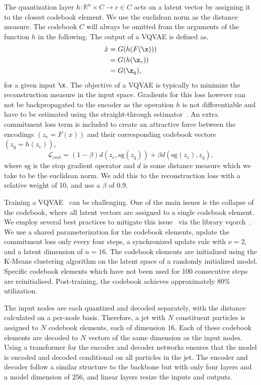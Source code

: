 The quantization layer $h: \mathbb{R}^n \times {C} \rightarrow c \in {C}$ acts on a latent vector by assigning it to the closest codebook element.
We use the euclidean norm as the distance measure.
The codebook $C$ will always be omitted from the arguments of the function $h$ in the following.
The output of a VQVAE is defined as,
\begin{align}
    \hat{x} & = G(h(F(\x))) \\
            & = G(h(\z_e))  \\
            & = G(\z_q),
\end{align}
for a given input $\x$.
The objective of a VQVAE is typically to minimize the reconstruction measure in the input space.
Gradients for this loss however can not be backpropagated to the encoder as the operation $h$ is not differentiable and have to be estimated using the straight-through estimator~\cite{StraightThrough}.
An extra commitment loss term is included to create an attractive force between the encodings $(z_e=F(x))$ and their corresponding codebook vectors $(z_q = h(z_e))$,
\begin{equation}
    \mathcal{L}_{cmt} = (1-\beta)d(z_e,\mathrm{sg}(z_q)) + \beta d(\mathrm{sg}(z_e),z_q),
\end{equation}
where $\mathrm{sg}$ is the stop gradient operator and $d$ is some distance measure which we take to be the euclidean norm.
We add this to the reconstruction loss with a relative weight of 10, and use a $\beta$ of 0.9.

Training a VQVAE~\cite{VQVAE} can be challenging.
One of the main issues is the collapse of the codebook, where all latent vectors are assigned to a single codebook element.
We employ several best practices to mitigate this issue~\cite{bettervqvae} via the library vqorch~\cite{VQTorch}.
We use a shared parameterization for the codebook elements, update the commitment loss only every four steps, a synchronized update rule with $\nu=2$, and a latent dimension of $n=16$.
The codebook elements are initialized using the K-Means clustering algorithm on the latent space of a randomly initialized model.
Specific codebook elements which have not been used for 100 consecutive steps are reinitialised.
Post-training, the codebook achieves approximately 80\% utilization.

The input nodes are each quantized and decoded separately, with the distance calculated on a per-node basis.
Therefore, a jet with $N$ constituent particles is assigned to $N$ codebook elements, each of dimension $16$.
Each of these codebook elements are decoded to $N$ vectors of the same dimension as the input nodes.
Using a transformer for the encoder and decoder networks ensures that the model is encoded and decoded conditional on all particles in the jet.
The encoder and decoder follow a similar structure to the backbone but with only four layers and a model dimension of $256$, and linear layers resize the inputs and outputs.

